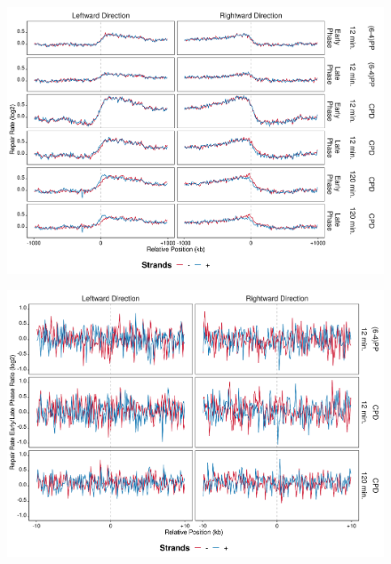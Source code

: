 \begin{figure}[H]
\begin{center}
\includegraphics[width=\textwidth]{Chapters/7_appendix/figures/supfig67}
\caption[]{}
\label{supfig:}
\end{center}
\end{figure}

\begin{figure}[H]
\begin{center}
\includegraphics[width=\textwidth]{Chapters/7_appendix/figures/supfig68}
\caption[]{}
\label{supfig:}
\end{center}
\end{figure}

